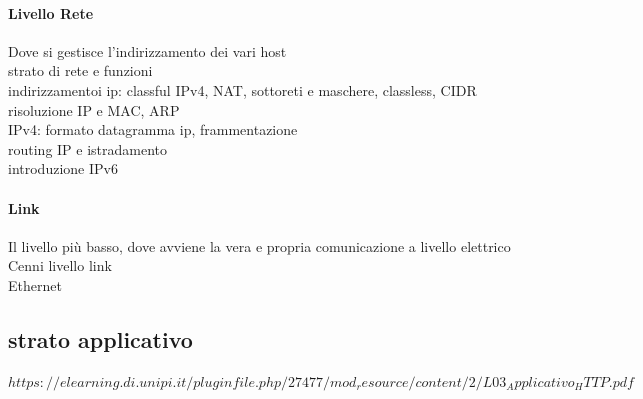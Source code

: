 \documentclass[10pt]{article}
\begin{document}
\paragraph{Livello Rete} Dove si gestisce l'indirizzamento dei vari host\\
strato di rete e funzioni\\
indirizzamentoi ip: classful IPv4, NAT, sottoreti e maschere, classless, CIDR\\
risoluzione IP e MAC, ARP\\
IPv4: formato datagramma ip, frammentazione\\
routing IP e istradamento\\
introduzione IPv6\\
\paragraph{Link} Il livello più basso, dove avviene la vera e propria comunicazione a livello elettrico\\
Cenni livello link\\
Ethernet\\
\subsection{strato applicativo}
$https://elearning.di.unipi.it/pluginfile.php/27477/mod_resource/content/2/L03_Applicativo_HTTP.pdf$
\end{document}
